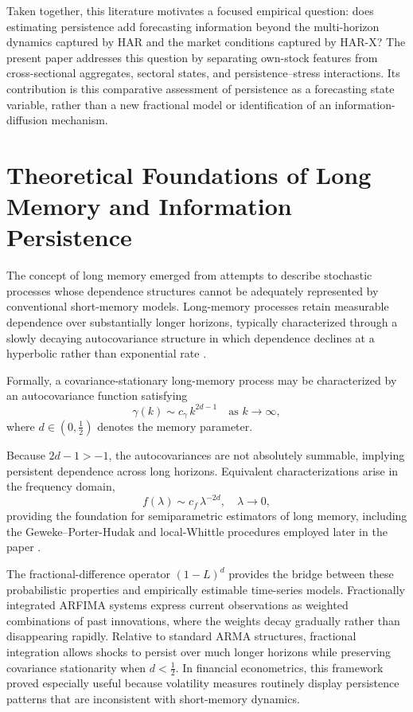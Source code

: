 \documentclass[jrfm,article,submit,moreauthors,pdftex]{Definitions/mdpi}
\begin{document}
Taken together, this literature motivates a focused empirical question:
does estimating persistence add forecasting information beyond the
multi-horizon dynamics captured by HAR and the market conditions captured
by HAR-X? The present paper addresses this question by separating own-stock
features from cross-sectional aggregates, sectoral states, and
persistence--stress interactions. Its contribution is this comparative
assessment of persistence as a forecasting state variable, rather than a
new fractional model or identification of an information-diffusion mechanism.

\section{Theoretical Foundations of Long Memory and Information
Persistence}
\label{sec:theory}

The concept of long memory emerged from attempts to describe stochastic
processes whose dependence structures cannot be adequately represented by
conventional short-memory models. Long-memory processes retain measurable
dependence over substantially longer horizons, typically characterized
through a slowly decaying autocovariance structure in which dependence
declines at a hyperbolic rather than exponential rate
\citep{granger1980introduction,hosking1981fractional}.

Formally, a covariance-stationary long-memory process may be characterized
by an autocovariance function satisfying
\begin{equation}
  \gamma(k) \sim c_\gamma\, k^{2d-1}\quad \text{as } k\to\infty,
  \label{eq:lm-autocov}
\end{equation}
where $d\in(0,\frac{1}{2})$ denotes the memory parameter.

Because $2d-1>-1$,
the autocovariances are not absolutely summable, implying persistent
dependence across long horizons. Equivalent characterizations arise in the
frequency domain,
\begin{equation}
  f(\lambda) \sim c_f\, \lambda^{-2d}, \quad \lambda \to 0,
\end{equation}
providing the foundation for semiparametric estimators of long memory,
including the Geweke--Porter-Hudak and local-Whittle procedures employed
later in the paper \citep{robinson1995gaussian}.

The fractional-difference operator $(1-L)^d$ provides the bridge between
these probabilistic properties and empirically estimable time-series models.
Fractionally integrated ARFIMA systems express current observations as
weighted combinations of past innovations, where the weights decay gradually
rather than disappearing rapidly. Relative to standard ARMA structures,
fractional integration allows shocks to persist over much longer horizons
while preserving covariance stationarity when $d<\frac{1}{2}$. In financial
econometrics, this framework proved especially useful because volatility
measures routinely display persistence patterns that are inconsistent with
short-memory dynamics.
\end{document}
